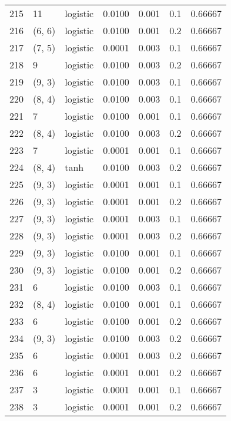 \begin{tabular}{lllrrrr}
215 &          11 &  logistic &  0.0100 &  0.001 &  0.1 &   0.66667 \\
216 &      (6, 6) &  logistic &  0.0100 &  0.001 &  0.2 &   0.66667 \\
217 &      (7, 5) &  logistic &  0.0001 &  0.003 &  0.1 &   0.66667 \\
218 &           9 &  logistic &  0.0100 &  0.003 &  0.2 &   0.66667 \\
219 &      (9, 3) &  logistic &  0.0100 &  0.003 &  0.1 &   0.66667 \\
220 &      (8, 4) &  logistic &  0.0100 &  0.003 &  0.1 &   0.66667 \\
221 &           7 &  logistic &  0.0100 &  0.001 &  0.1 &   0.66667 \\
222 &      (8, 4) &  logistic &  0.0100 &  0.003 &  0.2 &   0.66667 \\
223 &           7 &  logistic &  0.0001 &  0.001 &  0.1 &   0.66667 \\
224 &      (8, 4) &      tanh &  0.0100 &  0.003 &  0.2 &   0.66667 \\
225 &      (9, 3) &  logistic &  0.0001 &  0.001 &  0.1 &   0.66667 \\
226 &      (9, 3) &  logistic &  0.0001 &  0.001 &  0.2 &   0.66667 \\
227 &      (9, 3) &  logistic &  0.0001 &  0.003 &  0.1 &   0.66667 \\
228 &      (9, 3) &  logistic &  0.0001 &  0.003 &  0.2 &   0.66667 \\
229 &      (9, 3) &  logistic &  0.0100 &  0.001 &  0.1 &   0.66667 \\
230 &      (9, 3) &  logistic &  0.0100 &  0.001 &  0.2 &   0.66667 \\
231 &           6 &  logistic &  0.0100 &  0.003 &  0.1 &   0.66667 \\
232 &      (8, 4) &  logistic &  0.0100 &  0.001 &  0.1 &   0.66667 \\
233 &           6 &  logistic &  0.0100 &  0.001 &  0.2 &   0.66667 \\
234 &      (9, 3) &  logistic &  0.0100 &  0.003 &  0.2 &   0.66667 \\
235 &           6 &  logistic &  0.0001 &  0.003 &  0.2 &   0.66667 \\
236 &           6 &  logistic &  0.0001 &  0.001 &  0.2 &   0.66667 \\
237 &           3 &  logistic &  0.0001 &  0.001 &  0.1 &   0.66667 \\
238 &           3 &  logistic &  0.0001 &  0.001 &  0.2 &   0.66667 \\

\end{tabular}
